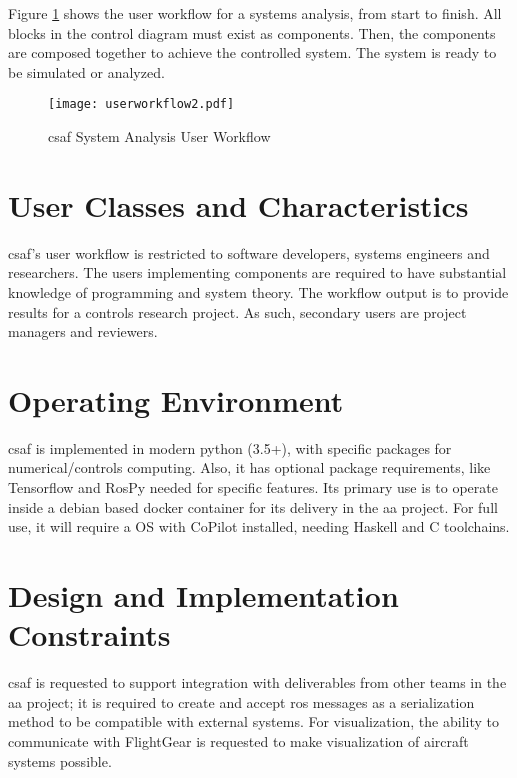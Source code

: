 Figure \ref{fig:uworkflow} shows the user workflow for a systems analysis, from start to finish. All blocks in the control diagram must exist as components. Then, the components are composed together to achieve the controlled system. The system is ready to be simulated or analyzed.

\begin{figure}
\centering
\texttt{[image: userworkflow2.pdf]}
\caption{ \acrshort{csaf} System Analysis User Workflow }
\label{fig:uworkflow}
\end{figure}

\section{User Classes and Characteristics}

\acrshort{csaf}'s user workflow is restricted to software developers, systems engineers and researchers. The users implementing components are required to have substantial knowledge of programming and system theory. The workflow output is to provide results for a controls research project. As such, secondary users are project managers and reviewers. 


\section{Operating Environment}

\acrshort{csaf} is implemented in modern python (3.5+), with specific packages for numerical/controls 
computing. Also, it has optional package requirements, like Tensorflow and RosPy needed for specific 
features. Its primary use is to operate inside a debian based docker container for its delivery in the 
\acrlong{aa} project. For full use, it will require a OS with CoPilot installed, needing Haskell and C toolchains.  

\section{Design and Implementation Constraints}

\acrshort{csaf} is requested to support integration with deliverables from other teams in the \acrshort{aa} 
project; it is required to create and accept \acrshort{ros} messages as a serialization method to be 
compatible with external systems. For visualization, the ability to communicate with FlightGear is requested 
to make visualization of aircraft systems possible. \\

